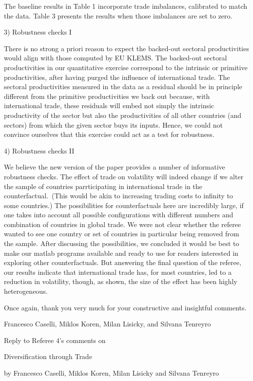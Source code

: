\documentclass[12pt]{article}
\begin{document}
The baseline results in Table 1 incorporate trade imbalances, calibrated to
match the data. Table 3 presents the results when those imbalances are set
to zero.\bigskip 

3) Robustness checks I

There is no strong a priori reason to expect the backed-out sectoral
productivities would align with those computed by EU KLEMS. The backed-out
sectoral productivities in our quantitative exercise correspond to the
intrinsic or primitive productivities, after having purged the influence of
international trade. The sectoral productivities measured in the data as a
residual should be in principle different from the primitive productivities
we back out because, with international trade, these residuals will embed
not simply the intrinsic productivity of the sector but also the
productivities of all other countries (and sectors) from which the given
sector buys its inputs. Hence, we could not convince ourselves that this
exercise could act as a test for robustness.\bigskip 

4) Robustness checks II

We believe the new version of the paper provides a number of informative
robustness checks. The effect of trade on volatility will indeed change if
we alter the sample of countries parrticipating in international trade in
the counterfactual.\ (This would be akin to increasing trading costs to
infinity to some countries.) The possibilities for counterfactuals here are
incredibly large, if one takes into account all possible configurations with
different numbers and combination of countries in global trade. We were not
clear whether the referee wanted to see one country or set of countries in
particular being removed from the sample. After discussing the
possibilities, we concluded it would be best to make our matlab programs
available and ready to use for readers interested in exploring other
counterfactuals. But answering the final question of the referee, our
results indicate that international trade has, for most countries, led to a
reduction in volatility, though, as shown, the size of the effect has been
highly heterogeneous.

\medskip \medskip \bigskip

Once again, thank you very much for your constructive and insightful
comments.

Francesco Caselli, Miklos Koren, Milan Lisicky, and Silvana Tenreyro

\pagebreak

\begin{center}
\thispagestyle{plain}\setcounter{page}{1}

Reply to Referee 4's comments on

{\Large Diversification through Trade}

by Francesco Caselli, Miklos Koren, Milan Lisicky and Silvana
Tenreyro\medskip \medskip \bigskip
\end{center}
\end{document}
